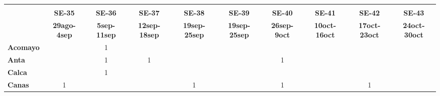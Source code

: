\begin{tabular}{lccccccccc}
	\textbf{}              & \multicolumn{1}{l}{}                        & \multicolumn{1}{l}{}      & \multicolumn{1}{l}{}                         & \multicolumn{1}{l}{}                         & \multicolumn{1}{l}{}                         & \multicolumn{1}{l}{}                        & \multicolumn{1}{l}{}                         & \multicolumn{1}{l}{}                         & \multicolumn{1}{l}{}     \\
	\textbf{}              & \textbf{SE-35}                              & \textbf{SE-36}            & \textbf{SE-37}                               & \textbf{SE-38}                               & \textbf{SE-39}                               & \textbf{SE-40}                              & \textbf{SE-41}                               & \textbf{SE-42}                               & \textbf{SE-43}           \\
	\textbf{}              & \textbf{29ago-4sep} & \textbf{5sep-11sep}       & \textbf{12sep-18sep} & \textbf{19sep-25sep} & \textbf{19sep-25sep} & \textbf{26sep-9oct} & \textbf{10oct-16oct} & \textbf{17oct-23oct} & \textbf{24oct-30oct}     \\
	\textbf{Acomayo}       & \cellcolor[HTML]{FCC46C}                    & 1                         & \cellcolor[HTML]{FCC46C}                     & \cellcolor[HTML]{FCC46C}                     & \cellcolor[HTML]{FCC46C}                     & \cellcolor[HTML]{FCC46C}                    & \cellcolor[HTML]{FCC46C}                     & \cellcolor[HTML]{FCC46C}                     & \cellcolor[HTML]{FCC46C} \\
	\textbf{Anta}          & \cellcolor[HTML]{FCC46C}                    & 1                         & \cellcolor[HTML]{FCC46C}1                    & \cellcolor[HTML]{FCC46C}                     & \cellcolor[HTML]{FCC46C}                     & \cellcolor[HTML]{FCC46C}1                   & \cellcolor[HTML]{FCC46C}                     & \cellcolor[HTML]{FCC46C}                     & \cellcolor[HTML]{FCC46C} \\
	\textbf{Calca}         & \cellcolor[HTML]{FCC46C}                    & \cellcolor[HTML]{FCC46C}1 & \cellcolor[HTML]{FCC46C}                     & \cellcolor[HTML]{FCC46C}                     & \cellcolor[HTML]{FCC46C}                     & \cellcolor[HTML]{FCC46C}                    & \cellcolor[HTML]{FCC46C}                     & \cellcolor[HTML]{FCC46C}                     & \cellcolor[HTML]{FCC46C} \\
	\textbf{Canas}         & 1                                           & \cellcolor[HTML]{FCC46C}  & \cellcolor[HTML]{FCC46C}                     & 1                                            & \cellcolor[HTML]{FCC46C}                     & \cellcolor[HTML]{FCC46C}1                   & \cellcolor[HTML]{FCC46C}                     & 1                                            & \cellcolor[HTML]{FCC46C} \\

\end{tabular}
